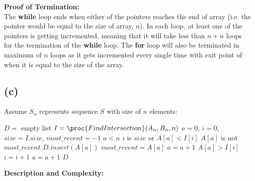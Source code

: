     \textbf{Proof of Termination:} \\
    The \textbf{while} loop ends when either of the pointers reaches the end of array (i.e. the pointer would be equal to the size of array, $n$). In each loop, at least one of the pointers is
    getting incremented, meaning that it will take less than $n+n$ loops for the termination of the \textbf{while} loop. The \textbf{for} loop will also be terminated in maximum of $n$ loops as it gets
    incremented every single time with exit point of when it is equal to the size of the array.

    \subsection{(c)}
    \begin{spacing}{1.5}
        Assume $S_n$ represents sequence $S$ with size of $n$ elements:
        \begin{codebox}
            \li $D =$ empty list
            \li $I = \proc{FindIntersection}(A_n, B_n, n)$
            \li $a = 0$, $i = 0$, $size=I.size$, $most\_recent = -1$
            \li \While $a < n$
                \Do
                    \li \If $i$ is $size$ or $A[a]<I[i]$
                    \Then
                        \li \If $A[a]$ is not $most\_recent$
                        \Then
                            \li $D.insert(A[a])$
                            \li $most\_recent = A[a]$
                        \End
                        \li $a = a + 1$
                    \li \ElseIf $A[a]>I[i]$
                    \Then
                        \li $i = i + 1$
                    \li \ElseNoIf
                        \li $a = a + 1$
                    \End 
                \End
            \li \Return $D$
        \end{codebox}
    \end{spacing}

    \textbf{Description and Complexity:}
    
